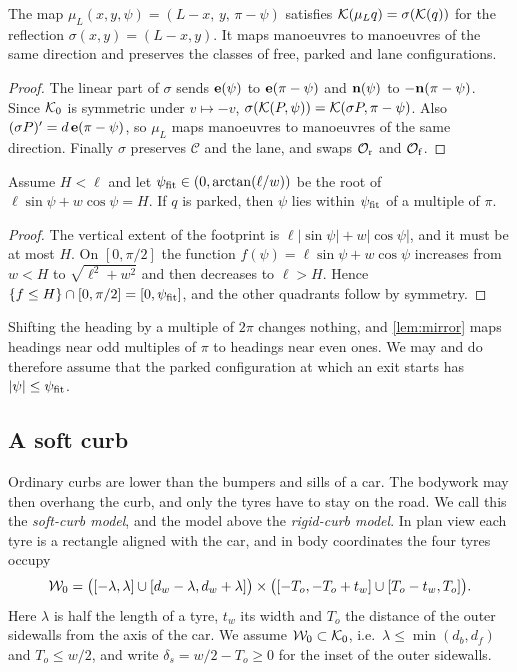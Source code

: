 \begin{lemma}\label{lem:mirror}
The map $\mu_L(x,y,\psi)=(L-x,\,y,\,\pi-\psi)$ satisfies $\mathcal{K}(\mu_L q)=\sigma(\mathcal{K}(q))$ for the reflection $\sigma(x,y)=(L-x,y)$.
It maps manoeuvres to manoeuvres of the same direction and preserves the classes of free, parked and lane configurations.
\end{lemma}
\begin{proof}
The linear part of $\sigma$ sends $\mathbf{e}(\psi)$ to $\mathbf{e}(\pi-\psi)$ and $\mathbf{n}(\psi)$ to $-\mathbf{n}(\pi-\psi)$.
Since $\mathcal{K}_0$ is symmetric under $v\mapsto -v$, $\sigma(\mathcal{K}(P,\psi))=\mathcal{K}(\sigma P,\pi-\psi)$.
Also $(\sigma P)'=d\,\mathbf{e}(\pi-\psi)$, so $\mu_L$ maps manoeuvres to manoeuvres of the same direction.
Finally $\sigma$ preserves $\mathcal C$ and the lane, and swaps $\mathcal{O}_{\mathrm r}$ and $\mathcal{O}_{\mathrm f}$.
\end{proof}

\begin{lemma}\label{lem:fit}
Assume $H<\ell$ and let $\psi_{\rm fit}\in(0,\arctan(\ell/w))$ be the root of $\ell\sin\psi+w\cos\psi=H$.
If $q$ is parked, then $\psi$ lies within $\psi_{\rm fit}$ of a multiple of $\pi$.
\end{lemma}
\begin{proof}
The vertical extent of the footprint is $\ell|\sin\psi|+w|\cos\psi|$, and it must be at most $H$.
On $[0,\pi/2]$ the function $f(\psi)=\ell\sin\psi+w\cos\psi$ increases from $w<H$ to $\sqrt{\ell^2+w^2}$ and then decreases to $\ell>H$.
Hence $\{f\le H\}\cap[0,\pi/2]=[0,\psi_{\rm fit}]$, and the other quadrants follow by symmetry.
\end{proof}

Shifting the heading by a multiple of $2\pi$ changes nothing, and \cref{lem:mirror} maps headings near odd multiples of $\pi$ to headings near even ones.
We may and do therefore assume that the parked configuration at which an exit starts has $|\psi|\le\psi_{\rm fit}$.

\subsection{A soft curb}\label{sec:model-soft}
Ordinary curbs are lower than the bumpers and sills of a car.
The bodywork may then overhang the curb, and only the tyres have to stay on the road.
We call this the \emph{soft-curb model}, and the model above the \emph{rigid-curb model}.
In plan view each tyre is a rectangle aligned with the car, and in body coordinates the four tyres occupy
\[
  \mathcal{W}_0=\big([-\lambda,\lambda]\cup[d_w-\lambda,d_w+\lambda]\big)\times\big([-T_o,-T_o+t_w]\cup[T_o-t_w,T_o]\big).
\]
Here $\lambda$ is half the length of a tyre, $t_w$ its width and $T_o$ the distance of the outer sidewalls from the axis of the car.
We assume $\mathcal{W}_0\subset\mathcal{K}_0$, i.e.\ $\lambda\le\min(d_b,d_f)$ and $T_o\le w/2$, and write $\delta_s=w/2-T_o\ge0$ for the inset of the outer sidewalls.

